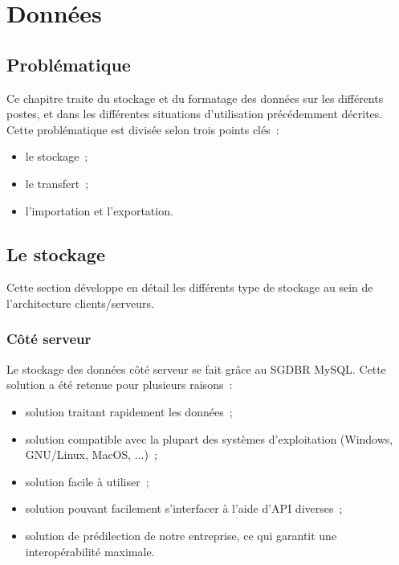 \section{Données}\label{DonneesTechnique}

% 

\subsection{Problématique}
Ce chapitre traite du stockage et du formatage des données sur les différents postes, et dans les différentes situations d'utilisation précédemment décrites. \\
Cette problématique est divisée selon trois points clés~:
\begin{itemize}
	\item le stockage~;
	\item le transfert~;
	\item l'importation et l'exportation.
\end{itemize}

\subsection{Le stockage}
Cette section développe en détail les différents type de stockage au sein de l'architecture clients/serveurs.

\subsubsection{Côté serveur}
Le stockage des données côté serveur se fait grâce au SGDBR MySQL. Cette solution a été retenue pour plusieurs raisons~:
\begin{itemize}
	\item solution traitant rapidement les données~;
	\item solution compatible avec la plupart des systèmes d'exploitation (Windows, GNU/Linux, MacOS, ...)~;
	\item solution facile à utiliser~;
	\item solution pouvant facilement s'interfacer à l'aide d'API diverses~;
	\item solution de prédilection de notre entreprise, ce qui garantit une interopérabilité maximale.
\end{itemize}

